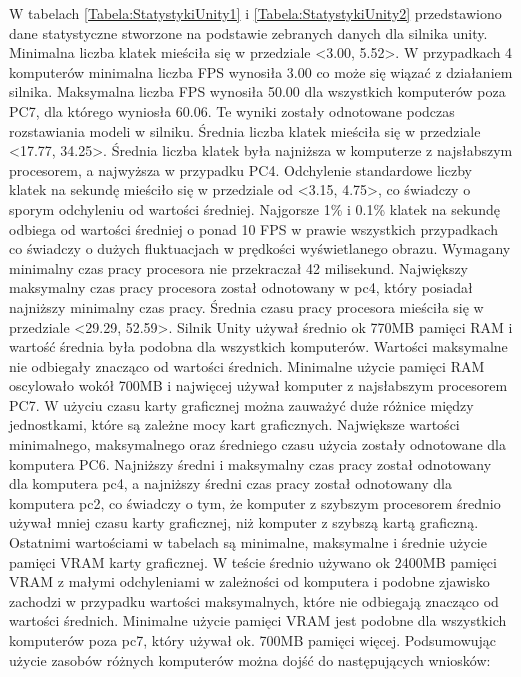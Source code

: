 \documentclass[12pt,twoside]{article}
\begin{document}
W tabelach \ref{Tabela:StatystykiUnity1} i \ref{Tabela:StatystykiUnity2}
przedstawiono dane statystyczne stworzone na podstawie zebranych danych dla
silnika unity. Minimalna liczba klatek mieściła się w przedziale <3.00, 5.52>. W
przypadkach 4 komputerów minimalna liczba FPS wynosiła 3.00 co może się wiązać z
działaniem silnika. Maksymalna liczba FPS wynosiła 50.00 dla wszystkich
komputerów poza PC7, dla którego wyniosła 60.06. Te wyniki zostały odnotowane
podczas rozstawiania modeli w silniku. Średnia liczba klatek mieściła się w
przedziale <17.77, 34.25>. Średnia liczba klatek była najniższa w komputerze z
najsłabszym procesorem, a najwyższa w przypadku PC4. Odchylenie standardowe
liczby klatek na sekundę mieściło się w przedziale od <3.15, 4.75>, co świadczy
o sporym odchyleniu od wartości średniej. Najgorsze 1\% i 0.1\% klatek
na sekundę odbiega od wartości średniej o ponad 10 FPS w prawie wszystkich
przypadkach co świadczy o dużych fluktuacjach w prędkości wyświetlanego obrazu.
Wymagany minimalny czas pracy procesora nie przekraczał 42 milisekund.
Największy maksymalny czas pracy procesora został odnotowany w pc4, który
posiadał najniższy minimalny czas pracy.  Średnia czasu pracy procesora mieściła
się w przedziale <29.29, 52.59>. Silnik Unity używał średnio ok 770MB pamięci
RAM i wartość średnia była podobna dla wszystkich komputerów. Wartości
maksymalne nie odbiegały znacząco od wartości średnich. Minimalne użycie pamięci
RAM oscylowało wokół 700MB i najwięcej używał komputer z najsłabszym procesorem
PC7. W użyciu czasu karty graficznej można zauważyć duże różnice między
jednostkami, które są zależne mocy kart graficznych. Największe wartości
minimalnego, maksymalnego oraz średniego czasu użycia zostały odnotowane dla
komputera PC6. Najniższy średni i maksymalny czas pracy został odnotowany dla
komputera pc4, a najniższy średni czas pracy został odnotowany dla komputera
pc2, co świadczy o tym, że komputer z szybszym procesorem średnio używał mniej
czasu karty graficznej, niż komputer z szybszą kartą graficzną. Ostatnimi
wartościami w tabelach są minimalne, maksymalne i średnie użycie pamięci VRAM
karty graficznej. W teście średnio używano ok 2400MB pamięci VRAM z małymi
odchyleniami w zależności od komputera i podobne zjawisko zachodzi w przypadku
wartości maksymalnych, które nie odbiegają znacząco od wartości średnich.
Minimalne użycie pamięci VRAM jest podobne dla wszystkich komputerów poza pc7,
który używał ok. 700MB pamięci więcej. 
Podsumowując użycie zasobów różnych komputerów można dojść do następujących
wniosków:
\end{document}
